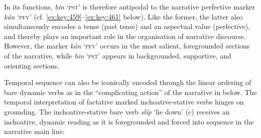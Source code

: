 In its functions, \textit{bin} ‘\textsc{pst}’ is therefore antipodal to the narrative perfective marker \textit{kán} ‘\textsc{pfv}’ (cf. \ref{ex:key:459}–\ref{ex:key:461} below). Like the former, the latter also simultaneously encodes a tense (past tense) and an aspectual value (perfective), and thereby plays an important role in the organisation of narrative discourse. However, the marker \textit{kán} ‘\textsc{pfv}’ occurs in the most salient, foregrounded sections of the narrative, while \textit{bin} ‘\textsc{pst}’ appears in backgrounded, supportive, and orienting sections. 


Temporal sequence can also be iconically encoded through the linear ordering of bare dynamic verbs as in the “complicating action” \citep{Labov1972} of the narrative in  below. The temporal interpretation of factative marked inchoative-stative verbs hinges on grounding. The inchoative-stative bare verb \textit{slíp} ‘lie down’ (c) receives an inchoative, dynamic reading as it is foregrounded and forced into sequence in the narrative main line:



\ea
\label{ex:key:457}
\z
\z

